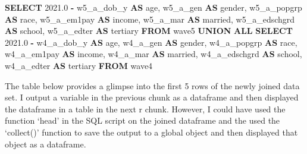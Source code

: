 \documentclass[11pt,preprint, authoryear]{elsarticle}
\numberwithin{equation}{section}
\numberwithin{figure}{section}
\numberwithin{table}{section}
\newenvironment{Shaded}{\begin{snugshade}}{\end{snugshade}}
\newcommand{\FloatTok}[1]{\textcolor[rgb]{0.00,0.00,0.81}{#1}}
\newcommand{\KeywordTok}[1]{\textcolor[rgb]{0.13,0.29,0.53}{\textbf{#1}}}
\newcommand{\NormalTok}[1]{#1}
\newcommand{\OperatorTok}[1]{\textcolor[rgb]{0.81,0.36,0.00}{\textbf{#1}}}
\begin{document}
\begin{Shaded}
\begin{Highlighting}[]
\KeywordTok{SELECT} \FloatTok{2021.0} \OperatorTok{{-}}\NormalTok{ \textasciigrave{}w5\_a\_dob\_y\textasciigrave{} }\KeywordTok{AS}\NormalTok{ \textasciigrave{}age\textasciigrave{}, \textasciigrave{}w5\_a\_gen\textasciigrave{} }\KeywordTok{AS}\NormalTok{ \textasciigrave{}gender\textasciigrave{}, \textasciigrave{}w5\_a\_popgrp\textasciigrave{} }\KeywordTok{AS}\NormalTok{ \textasciigrave{}race\textasciigrave{}, }
\NormalTok{\textasciigrave{}w5\_a\_em1pay\textasciigrave{} }\KeywordTok{AS}\NormalTok{ \textasciigrave{}income\textasciigrave{}, \textasciigrave{}w5\_a\_mar\textasciigrave{} }\KeywordTok{AS}\NormalTok{ \textasciigrave{}married\textasciigrave{}, \textasciigrave{}w5\_a\_edschgrd\textasciigrave{} }\KeywordTok{AS}\NormalTok{ \textasciigrave{}school\textasciigrave{}, }
\NormalTok{\textasciigrave{}w5\_a\_edter\textasciigrave{} }\KeywordTok{AS}\NormalTok{ \textasciigrave{}tertiary\textasciigrave{} }\KeywordTok{FROM}\NormalTok{ \textasciigrave{}wave5\textasciigrave{}}
\KeywordTok{UNION} \KeywordTok{ALL}
\KeywordTok{SELECT} \FloatTok{2021.0} \OperatorTok{{-}}\NormalTok{ \textasciigrave{}w4\_a\_dob\_y\textasciigrave{} }\KeywordTok{AS}\NormalTok{ \textasciigrave{}age\textasciigrave{}, \textasciigrave{}w4\_a\_gen\textasciigrave{} }\KeywordTok{AS}\NormalTok{ \textasciigrave{}gender\textasciigrave{}, \textasciigrave{}w4\_a\_popgrp\textasciigrave{} }\KeywordTok{AS}\NormalTok{ \textasciigrave{}race\textasciigrave{}, }
\NormalTok{\textasciigrave{}w4\_a\_em1pay\textasciigrave{} }\KeywordTok{AS}\NormalTok{ \textasciigrave{}income\textasciigrave{}, \textasciigrave{}w4\_a\_mar\textasciigrave{} }\KeywordTok{AS}\NormalTok{ \textasciigrave{}married\textasciigrave{}, \textasciigrave{}w4\_a\_edschgrd\textasciigrave{} }\KeywordTok{AS}\NormalTok{ \textasciigrave{}school\textasciigrave{}, }
\NormalTok{\textasciigrave{}w4\_a\_edter\textasciigrave{} }\KeywordTok{AS}\NormalTok{ \textasciigrave{}tertiary\textasciigrave{} }\KeywordTok{FROM}\NormalTok{ \textasciigrave{}wave4\textasciigrave{}}
\end{Highlighting}
\end{Shaded}

The table below provides a glimpse into the first 5 rows of the newly
joined data set. I output a variable in the previous chunk as a
dataframe and then displayed the dataframe in a table in the next r
chunk. However, I could have used the function `head' in the SQL script
on the joined dataframe and the used the `collect()' function to save
the output to a global object and then displayed that object as a
dataframe.
\end{document}
